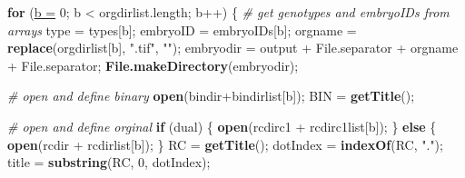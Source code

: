 \documentclass[11pt,singlespacinge,twoside]{reedthesis} %
\newenvironment{Shaded}{}{}
\newcommand{\CommentTok}[1]{\textit{#1}}
\newcommand{\ControlFlowTok}[1]{\textbf{#1}}
\newcommand{\DataTypeTok}[1]{\underline{#1}}
\newcommand{\DecValTok}[1]{#1}
\newcommand{\KeywordTok}[1]{\textbf{#1}}
\newcommand{\NormalTok}[1]{#1}
\newcommand{\OperatorTok}[1]{#1}
\newcommand{\StringTok}[1]{#1}
\theoremstyle{definition}
\theoremstyle{definition}
\theoremstyle{definition}
\theoremstyle{remark}
\begin{document}
\scriptsize
\begin{Shaded}
\begin{Highlighting}[numbers=left,,]
\ControlFlowTok{for}\NormalTok{ (}\DataTypeTok{b =} \DecValTok{0}\NormalTok{; b }\OperatorTok{<}\StringTok{ }\NormalTok{orgdirlist.length; b}\OperatorTok{++}\NormalTok{) \{}
\CommentTok{# get genotypes and embryoIDs from arrays}
\NormalTok{    type =}\StringTok{ }\NormalTok{types[b];}
\NormalTok{    embryoID =}\StringTok{ }\NormalTok{embryoIDs[b];}
\NormalTok{    orgname =}\StringTok{ }\KeywordTok{replace}\NormalTok{(orgdirlist[b], }\StringTok{".tif"}\NormalTok{, }\StringTok{""}\NormalTok{);}
\NormalTok{    embryodir =}\StringTok{ }\NormalTok{output }\OperatorTok{+}\StringTok{ }\NormalTok{File.separator }\OperatorTok{+}\StringTok{ }\NormalTok{orgname }\OperatorTok{+}\StringTok{ }\NormalTok{File.separator;}
    \KeywordTok{File.makeDirectory}\NormalTok{(embryodir);}
    
\CommentTok{# open and define binary}
    \KeywordTok{open}\NormalTok{(bindir}\OperatorTok{+}\NormalTok{bindirlist[b]);}
\NormalTok{    BIN =}\StringTok{ }\KeywordTok{getTitle}\NormalTok{();}
          
\CommentTok{# open and define orginal }
    \ControlFlowTok{if}\NormalTok{ (dual) \{}
        \KeywordTok{open}\NormalTok{(rcdirc1 }\OperatorTok{+}\StringTok{ }\NormalTok{rcdirc1list[b]);}
\NormalTok{    \} }\ControlFlowTok{else}\NormalTok{ \{}
        \KeywordTok{open}\NormalTok{(rcdir }\OperatorTok{+}\StringTok{ }\NormalTok{rcdirlist[b]);}
\NormalTok{    \}}
\NormalTok{    RC =}\StringTok{ }\KeywordTok{getTitle}\NormalTok{();}
\NormalTok{    dotIndex =}\StringTok{ }\KeywordTok{indexOf}\NormalTok{(RC, }\StringTok{"."}\NormalTok{);}
\NormalTok{    title =}\StringTok{ }\KeywordTok{substring}\NormalTok{(RC, }\DecValTok{0}\NormalTok{, dotIndex);}
    

\end{Highlighting}
\end{Shaded}
\end{document}
